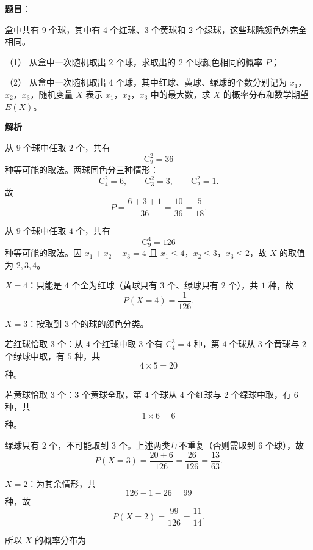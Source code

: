 \begin{answer}

\textbf{题目}：

盒中共有 9 个球，其中有 4 个红球、3 个黄球和 2 个绿球，这些球除颜色外完全相同。

（1） 从盒中一次随机取出 2 个球，求取出的 2 个球颜色相同的概率 $P$；

（2） 从盒中一次随机取出 4 个球，其中红球、黄球、绿球的个数分别记为 $x_1$，$x_2$，$x_3$，随机变量 $X$ 表示 $x_1$，$x_2$，$x_3$ 中的最大数，求 $X$ 的概率分布和数学期望 $E(X)$。

\textbf{解析}


从 $9$ 个球中任取 $2$ 个，共有
\nopagebreak[4]
\[\mathrm C_9^2=36\]
种等可能的取法。两球同色分三种情形：
\nopagebreak[4]
\[\mathrm C_4^2=6,\qquad \mathrm C_3^2=3,\qquad \mathrm C_2^2=1.\]
故
\nopagebreak[4]
\[P=\frac{6+3+1}{36}=\frac{10}{36}=\frac5{18}.\]


从 $9$ 个球中任取 $4$ 个，共有
\nopagebreak[4]
\[\mathrm C_9^4=126\]
种等可能的取法。因 $x_1+x_2+x_3=4$ 且 $x_1\leqslant4$，$x_2\leqslant3$，$x_3\leqslant2$，故 $X$ 的取值为 $2,3,4$。

$X=4$：只能是 $4$ 个全为红球（黄球只有 $3$ 个、绿球只有 $2$ 个），共 $1$ 种，故
\nopagebreak[4]
\[P(X=4)=\frac1{126}.\]

$X=3$：按取到 $3$ 个的球的颜色分类。

若红球恰取 $3$ 个：从 $4$ 个红球中取 $3$ 个有 $\mathrm C_4^3=4$ 种，第 $4$ 个球从 $3$ 个黄球与 $2$ 个绿球中取，有 $5$ 种，共
\nopagebreak[4]
\[4\times5=20\]
种。

若黄球恰取 $3$ 个：$3$ 个黄球全取，第 $4$ 个球从 $4$ 个红球与 $2$ 个绿球中取，有 $6$ 种，共
\nopagebreak[4]
\[1\times6=6\]
种。

绿球只有 $2$ 个，不可能取到 $3$ 个。上述两类互不重复（否则需取到 $6$ 个球），故
\nopagebreak[4]
\[P(X=3)=\frac{20+6}{126}=\frac{26}{126}=\frac{13}{63}.\]

$X=2$：为其余情形，共
\nopagebreak[4]
\[126-1-26=99\]
种，故
\nopagebreak[4]
\[P(X=2)=\frac{99}{126}=\frac{11}{14}.\]

所以 $X$ 的概率分布为


\end{answer}
